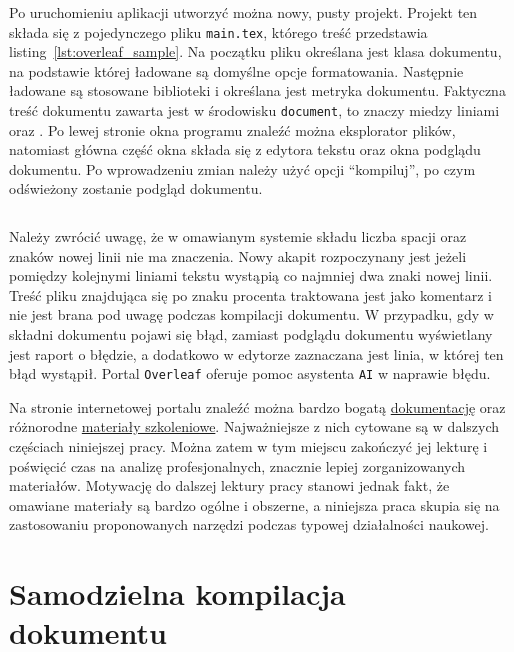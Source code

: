 Po uruchomieniu aplikacji utworzyć można nowy, pusty projekt. Projekt ten składa się z pojedynczego pliku \texttt{main.tex}, którego treść przedstawia listing~\ref{lst:overleaf_sample}. Na początku pliku określana jest klasa dokumentu, na podstawie której ładowane są domyślne opcje formatowania. Następnie ładowane są stosowane biblioteki i określana jest metryka dokumentu. Faktyczna treść dokumentu zawarta jest w środowisku \texttt{document}, to znaczy miedzy liniami \texttt{} oraz \texttt{}. Po lewej stronie okna programu znaleźć można eksplorator plików, natomiast główna część okna składa się z edytora tekstu oraz okna podglądu dokumentu. Po wprowadzeniu zmian należy użyć opcji \enquote{kompiluj}, po czym odświeżony zostanie podgląd dokumentu.

\begin{listing}[htb]
\inputminted{latex}{skrypty/overleaf_sample.tex}
\end{listing}

Należy zwrócić uwagę, że w omawianym systemie składu liczba spacji oraz znaków nowej linii nie ma znaczenia. Nowy akapit rozpoczynany jest jeżeli pomiędzy kolejnymi liniami tekstu wystąpią co najmniej dwa znaki nowej linii. Treść pliku znajdująca się po znaku procenta traktowana jest jako komentarz i nie jest brana pod uwagę podczas kompilacji dokumentu. W przypadku, gdy w składni dokumentu pojawi się błąd, zamiast podglądu dokumentu wyświetlany jest raport o błędzie, a dodatkowo w edytorze zaznaczana jest linia, w której ten błąd wystąpił. Portal \texttt{Overleaf} oferuje pomoc asystenta \texttt{AI} w naprawie błędu.

Na stronie internetowej portalu znaleźć można bardzo bogatą \href{https://www.overleaf.com/learn}{dokumentację} oraz różnorodne \href{https://www.overleaf.com/learn/latex/Learn_LaTeX_in_30_minutes}{materiały szkoleniowe}. Najważniejsze z nich cytowane są w dalszych częściach niniejszej pracy. Można zatem w tym miejscu zakończyć jej lekturę i poświęcić czas na analizę profesjonalnych, znacznie lepiej zorganizowanych materiałów. Motywację do dalszej lektury pracy stanowi jednak fakt, że omawiane materiały są bardzo ogólne i obszerne, a niniejsza praca skupia się na zastosowaniu proponowanych narzędzi podczas typowej działalności naukowej.

\section{Samodzielna kompilacja dokumentu}


